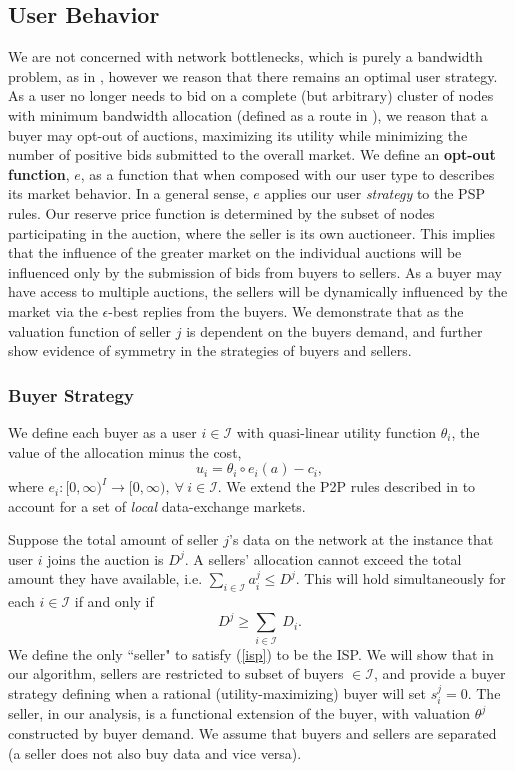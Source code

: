 \documentclass[12pt]{article}
\theoremstyle{definition}
\newcommand{\mcI}{\mathcal{I}}
\begin{document}
\begin{multicols}{2}
\subsection{User Behavior}

We are not concerned with network
bottlenecks, which is purely a bandwidth problem, as in \cite{semret}, however
we reason that there remains an optimal user strategy. As a user no longer needs
to bid on a complete (but arbitrary)
cluster of nodes with minimum bandwidth allocation (defined as a route in
\cite{semret}), we reason that a buyer may opt-out of auctions, maximizing its
utility while minimizing the number of positive bids submitted to the overall
market. We define an \textbf{opt-out function}, $e$, as a function that when composed with our user type to describes
its market behavior. In a general sense, $e$ applies our user \emph{strategy}
to the PSP rules.
Our reserve price function is determined by the subset of nodes participating in the
auction, where the seller is its own auctioneer. This implies that the influence of the greater market on the individual
auctions will be influenced only by the submission of bids from buyers to
sellers. As a buyer may have access to multiple auctions, the sellers will be
dynamically influenced by the market via the $\epsilon$-best replies from the
buyers. We demonstrate that as the valuation function of seller $j$ is dependent
on the buyers demand, and further show evidence of symmetry in the strategies of
buyers and sellers.

\subsubsection{Buyer Strategy}

We define each buyer as a user $i\in\mcI$ with quasi-linear utility
function $\theta_i$, the value of the allocation minus the cost,
\begin{equation}\label{buyerutility}
    u_i = \theta_i \circ e_i(a) - c_i,
\end{equation}
where $e_i : [0, \infty)^I \rightarrow [0,\infty), \ \forall \ i \in \mcI$. 
We extend the P2P rules described
in \cite{semret} to account for a set of \emph{local} data-exchange markets.

Suppose the total amount of seller $j$'s data on the network at the instance that
user $i$ joins the auction is $D^j$. 
A sellers' allocation cannot exceed the total amount they have available,
i.e. $\sum_{i\in\mcI} a_i^j \le D^j$. This will hold simultaneously for each $i \in
\mcI$ if and only if 
\begin{equation}\label{isp}
    D^j \ge \sum_{i\in\mcI} \ D_i.
\end{equation}
We define the only ``seller" to satisfy (\ref{isp}) to be the ISP.
We will show that in our
algorithm, sellers are restricted to subset of buyers $\in\mcI$, and provide a
buyer strategy defining when a rational (utility-maximizing) buyer will set $s_i^j = 0$. The seller, in our analysis, is a functional
extension of the buyer, with valuation $\theta^j$ constructed by buyer demand.
We assume that buyers and sellers are separated (a seller does not also buy
data and vice versa).


\end{multicols}
\end{document}

